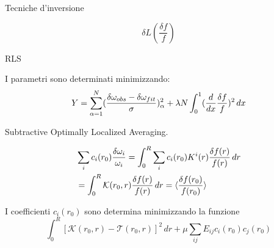 \documentclass[10pt,xcolor={usenames},fleqn,mathserif,serif]{beamer}
\begin{document}
\begin{frame}{Tecniche d'inversione}

\[\delta L(\frac{\delta f}{f})\]

\begin{block}{RLS}

I parametri sono determinati minimizzando:
\begin{equation*}
Y=\sum_{\alpha=1}^N(\frac{\delta\omega_{obs}-\delta\omega_{fit}}{\sigma})^2_{\alpha}+\lambda N\int_0^1(\frac{d}{d x}\frac{\delta f}{f})^2\,dx
\end{equation*}

\end{block}

\begin{block}{Subtractive Optimally Localized Averaging.}

\begin{align*}
&\sum_ic_i(r_0)\frac{\delta\omega_i}{\omega_i}=\int_0^R\sum_ic_i(r_0)K^i(r)\frac{\delta f(r)}{f(r)}\,dr\\
&=\int_0^R\mathcal{K}(r_0,r)\frac{\delta f(r)}{f(r)}\,dr=\langle \frac{\delta f(r_0)}{f(r_0)} \rangle
\end{align*}

I coefficienti $c_i(r_0)$ sono determina minimizzando la funzione
\begin{equation*}
\int_0^R[\mathcal{K}(r_0,r)-\mathcal{T}(r_0,r)]^2\,dr+\mu\sum_{ij}E_{ij}c_i(r_0)c_j(r_0)
\end{equation*}

\end{block}

\end{frame}
\end{document}
